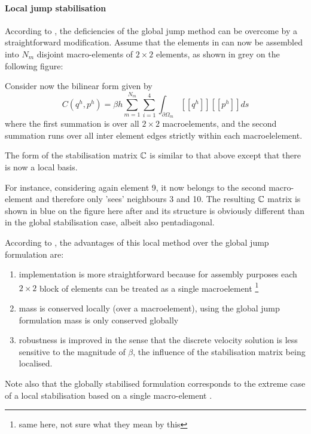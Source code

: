 \paragraph{Local jump stabilisation}

According to \textcite{sike90}, the deficiencies of the global jump method can be overcome by  
a straightforward modification. Assume that the elements in  
can now be assembled into $N_m$ disjoint macro-elements 
of $2\times 2$ elements, as shown in grey on the following figure: 

\begin{center}

\end{center}

Consider now the bilinear form given by
\[
C(q^h,p^h) = \beta h \sum_{m=1}^{N_m} \sum_{i=1}^4 \int_{\partial \Omega_m}[[ q^h ]]  [[p^h ]] ds
\]
where the first summation is over all $2\times 2$ macroelements,
and the second summation runs over all inter element edges strictly within 
each macroelelement. 

The form of the stabilisation matrix ${\mathbb{C}}$ 
is similar to that above except that there is now a
local basis.

For instance, considering again element 9, it now belongs to the second macro-element
and therefore only 'sees' neighbours 3 and 10.
The resulting ${\mathbb{C}}$ matrix is shown in blue on the figure here after and 
its structure is obviously different than in the global stabilisation case, albeit 
also pentadiagonal. 

According to \textcite{sike90}, the advantages of this local method over the global jump 
formulation are: 
\begin{enumerate}
\item implementation is more straightforward because for assembly purposes each $2\times 2$ block
of elements can be treated as a single macroelement \footnote{same here, not sure what they mean by this}
\item mass is conserved locally (over a macroelement), using the global jump formulation
mass is only conserved globally
\item robustness is improved in the sense that the discrete velocity solution is less sensitive 
to the magnitude of $\beta$, the influence of the stabilisation matrix being localised.
\end{enumerate}

Note also that the globally stabilised formulation corresponds to the 
extreme case of a local stabilisation based on a single macro-element \cite{grsa}.

